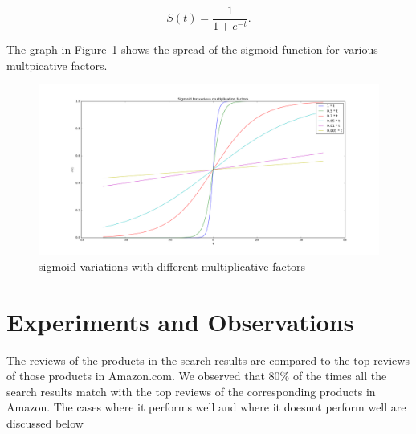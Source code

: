 \documentclass{article}
\begin{document}
\begin{equation}
S(t) = \frac{1}{1 + e^{-t}}.
\end{equation}

The graph in Figure~\ref{fig:sigmoid} shows the spread of the sigmoid function for various multpicative factors.
\begin{figure}[ht!]
  \centering
  \includegraphics[width=1\textwidth]{sigmoidVariations}
  \caption{sigmoid variations with different multiplicative factors\label{fig:sigmoid}}
\end{figure}

\section{Experiments and Observations}
The reviews of the products in the search results are compared to the top reviews of those products in Amazon.com. We observed that 80\% of the times all the search results match with the top reviews of the corresponding products in Amazon. The cases where it performs well and where it doesnot perform well are discussed below
\end{document}

